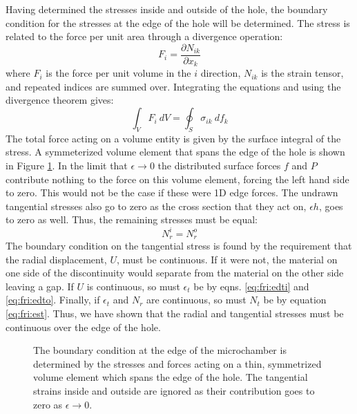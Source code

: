 Having determined the stresses inside and outside of the hole, the boundary condition for the stresses at the edge of the hole will be determined.
The stress is related to the force per unit area through a divergence operation:
\begin{equation}
	F_i=\frac{\partial N_{ik}}{\partial x_k}
\end{equation}
where $F_i$ is the force per unit volume in the $i$ direction, $N_{ik}$ is the strain tensor, and repeated indices are summed over.
Integrating the equations and using the divergence theorem gives:
\begin{equation}
	\int_V F_i \ dV=\oint_S \sigma_{ik} \ df_k
\end{equation}
The total force acting on a volume entity is given by the surface integral of the stress.
A symmeterized volume element that spans the edge of the hole is shown in Figure \ref{fig:fri:egestress}.
In the limit that $\epsilon \rightarrow 0$ the distributed surface forces $f$ and $P$ contribute nothing to the force on this volume element, forcing the left hand side to zero.
This would not be the case if these were 1D edge forces.
The undrawn tangential stresses also go to zero as the cross section that they act on, $\epsilon h$, goes to zero as well. 
Thus, the remaining stresses must be equal:
\begin{equation}
	N_r^i=N_r^o
\end{equation}
The boundary condition on the tangential stress is found by the requirement that the radial displacement, $U$, must be continuous.
If it were not, the material on one side of the discontinuity would separate from the material on the other side leaving a gap.
If $U$ is continuous, so must $\epsilon_t$ be by eqns. \ref{eq:fri:edti} and \ref{eq:fri:edto}.
Finally, if $\epsilon_t$ and $N_r$ are continuous, so must $N_t$ be by equation \ref{eq:fri:est}.
Thus, we have shown that the radial and tangential stresses must be continuous over the edge of the hole.

\begin{figure}
	\begin{center}
	
	\end{center}
	\caption[The boundary condition at the edge of the microchamber]{\label{fig:fri:egestress}The boundary condition at the edge of the microchamber is determined by the stresses and forces acting on a thin, symmetrized volume element which spans the edge of the hole.  The tangential strains inside and outside are ignored as their contribution goes to zero as $\epsilon \rightarrow 0$.}
\end{figure}

